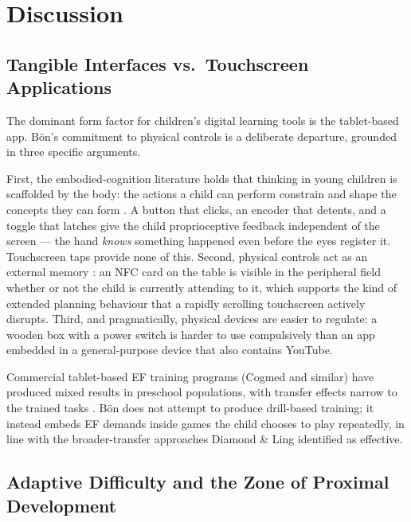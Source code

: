 \documentclass[12pt, a4paper]{article}
\newcommand{\Bodn}{B\"o\dh{}n}
\begin{document}
\section{Discussion}
\label{sec:discussion}

\subsection{Tangible Interfaces vs.\ Touchscreen Applications}

The dominant form factor for children's digital learning tools is the
tablet-based app. \Bodn{}'s commitment to physical controls is a deliberate
departure, grounded in three specific arguments.

First, the embodied-cognition literature holds that thinking in young children
is scaffolded by the body: the actions a child can perform constrain and shape
the concepts they can form \citep{antle2013embodied, price2003tangibles}. A
button that clicks, an encoder that detents, and a toggle that latches give the
child proprioceptive feedback independent of the screen --- the hand
\emph{knows} something happened even before the eyes register it. Touchscreen
taps provide none of this. Second, physical controls act as an external memory
\citep{manches2012tangibles}: an NFC card on the table is visible in the
peripheral field whether or not the child is currently attending to it, which
supports the kind of extended planning behaviour that a rapidly scrolling
touchscreen actively disrupts. Third, and pragmatically, physical devices are
easier to regulate: a wooden box with a power switch is harder to use
compulsively than an app embedded in a general-purpose device that also
contains YouTube.

Commercial tablet-based EF training programs (Cogmed and similar) have produced
mixed results in preschool populations, with transfer effects narrow to the
trained tasks \citep{diamond2016conclusions}. \Bodn{} does not attempt to
produce drill-based training; it instead embeds EF demands inside games the
child chooses to play repeatedly, in line with the broader-transfer
approaches Diamond \& Ling identified as effective.

\subsection{Adaptive Difficulty and the Zone of Proximal Development}
\end{document}
